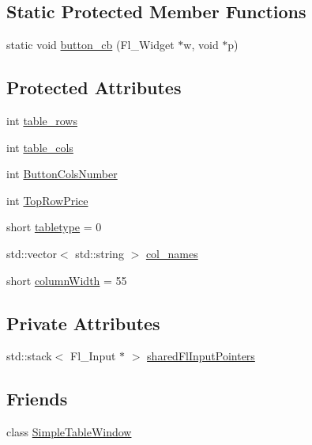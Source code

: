 \subsection*{Static Protected Member Functions}
\begin{DoxyCompactItemize}
\item 
static void \hyperlink{class_mike_1_1_wid_table_base_afba70372ad656f248ca4ea9dc408e41f}{button\+\_\+cb} (Fl\+\_\+\+Widget $\ast$w, void $\ast$p)
\end{DoxyCompactItemize}
\subsection*{Protected Attributes}
\begin{DoxyCompactItemize}
\item 
int \hyperlink{class_mike_1_1_wid_table_base_a72f42a61350eb88e259047217fe4d92f}{table\+\_\+rows}
\item 
int \hyperlink{class_mike_1_1_wid_table_base_a286d2c5a539c51110c59cbc3b5121d5b}{table\+\_\+cols}
\item 
int \hyperlink{class_mike_1_1_wid_table_base_a1f418b75c1d456ef2c167809edfa17db}{Button\+Cols\+Number}
\item 
int \hyperlink{class_mike_1_1_wid_table_base_a0b15be1c88a8a50bb65df9eb43027732}{Top\+Row\+Price}
\item 
short \hyperlink{class_mike_1_1_wid_table_base_a8821c66c2f042e78997e6f2b132b0b4d}{tabletype} = 0
\item 
std\+::vector$<$ std\+::string $>$ \hyperlink{class_mike_1_1_wid_table_base_acc76591b1fa97f8259fc95f492d8e1b9}{col\+\_\+names}
\item 
short \hyperlink{class_mike_1_1_wid_table_base_a610c3e633ae8fc7290881ffeda317475}{column\+Width} = 55
\end{DoxyCompactItemize}
\subsection*{Private Attributes}
\begin{DoxyCompactItemize}
\item 
std\+::stack$<$ Fl\+\_\+\+Input $\ast$ $>$ \hyperlink{class_mike_1_1_wid_table_base_a50bcff267ab19f59fa27bfb2264f815b}{shared\+Fl\+Input\+Pointers}
\end{DoxyCompactItemize}
\subsection*{Friends}
\begin{DoxyCompactItemize}
\item 
class \hyperlink{class_mike_1_1_wid_table_base_a3890cb6751c73d6d400ecb8ab17d7f2d}{Simple\+Table\+Window}
\end{DoxyCompactItemize}


